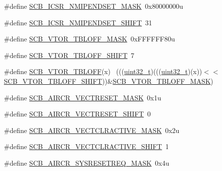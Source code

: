 \begin{DoxyCompactItemize}
\item 
\#define \hyperlink{group___s_c_b___register___masks_gab2a6cb5708895a81ec8826b8fa546145}{S\+C\+B\+\_\+\+I\+C\+S\+R\+\_\+\+N\+M\+I\+P\+E\+N\+D\+S\+E\+T\+\_\+\+M\+A\+SK}~0x80000000u
\item 
\#define \hyperlink{group___s_c_b___register___masks_ga8a185fc794df7e755e5f3a8b3a06d042}{S\+C\+B\+\_\+\+I\+C\+S\+R\+\_\+\+N\+M\+I\+P\+E\+N\+D\+S\+E\+T\+\_\+\+S\+H\+I\+FT}~31
\item 
\#define \hyperlink{group___s_c_b___register___masks_ga07fd57e90baff628af14394c8142dc27}{S\+C\+B\+\_\+\+V\+T\+O\+R\+\_\+\+T\+B\+L\+O\+F\+F\+\_\+\+M\+A\+SK}~0x\+F\+F\+F\+F\+F\+F80u
\item 
\#define \hyperlink{group___s_c_b___register___masks_gac6092f3c78a9f126c2d02740a7976708}{S\+C\+B\+\_\+\+V\+T\+O\+R\+\_\+\+T\+B\+L\+O\+F\+F\+\_\+\+S\+H\+I\+FT}~7
\item 
\#define \hyperlink{group___s_c_b___register___masks_ga0fc8974ae1755bc9819c97712403b828}{S\+C\+B\+\_\+\+V\+T\+O\+R\+\_\+\+T\+B\+L\+O\+FF}(x)                                          ~(((\hyperlink{_p_e___types_8h_a33594304e786b158f3fb30289278f5af}{uint32\+\_\+t})(((\hyperlink{_p_e___types_8h_a33594304e786b158f3fb30289278f5af}{uint32\+\_\+t})(x))$<$$<$\hyperlink{group___s_c_b___register___masks_gac6092f3c78a9f126c2d02740a7976708}{S\+C\+B\+\_\+\+V\+T\+O\+R\+\_\+\+T\+B\+L\+O\+F\+F\+\_\+\+S\+H\+I\+FT}))\&\hyperlink{group___s_c_b___register___masks_ga07fd57e90baff628af14394c8142dc27}{S\+C\+B\+\_\+\+V\+T\+O\+R\+\_\+\+T\+B\+L\+O\+F\+F\+\_\+\+M\+A\+SK})
\item 
\#define \hyperlink{group___s_c_b___register___masks_gac4c28207a4bc452bd147dd820037eb08}{S\+C\+B\+\_\+\+A\+I\+R\+C\+R\+\_\+\+V\+E\+C\+T\+R\+E\+S\+E\+T\+\_\+\+M\+A\+SK}~0x1u
\item 
\#define \hyperlink{group___s_c_b___register___masks_ga55414e87d5441a65f2ddc8039a9472aa}{S\+C\+B\+\_\+\+A\+I\+R\+C\+R\+\_\+\+V\+E\+C\+T\+R\+E\+S\+E\+T\+\_\+\+S\+H\+I\+FT}~0
\item 
\#define \hyperlink{group___s_c_b___register___masks_ga185d1b709217248a97734877cf639eac}{S\+C\+B\+\_\+\+A\+I\+R\+C\+R\+\_\+\+V\+E\+C\+T\+C\+L\+R\+A\+C\+T\+I\+V\+E\+\_\+\+M\+A\+SK}~0x2u
\item 
\#define \hyperlink{group___s_c_b___register___masks_gacc6a889c36f0c9d996ab29dc076eec6e}{S\+C\+B\+\_\+\+A\+I\+R\+C\+R\+\_\+\+V\+E\+C\+T\+C\+L\+R\+A\+C\+T\+I\+V\+E\+\_\+\+S\+H\+I\+FT}~1
\item 
\#define \hyperlink{group___s_c_b___register___masks_gab69a066f25df4f52635379ca69f99b35}{S\+C\+B\+\_\+\+A\+I\+R\+C\+R\+\_\+\+S\+Y\+S\+R\+E\+S\+E\+T\+R\+E\+Q\+\_\+\+M\+A\+SK}~0x4u
$$
\end{DoxyCompactItemize}
